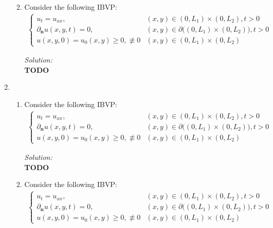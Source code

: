 \documentclass[10pt]{amsart}
\theoremstyle{nonumberplain}
\begin{document}
\begin{enumerate}[label={\bf {\arabic*}:}]
\begin{enumerate}
\newpage


\item Consider the following IBVP:
\begin{align*}
\begin{cases}
u_t = u_{xx}, &(x, y) \in (0, L_1) \times (0, L_2), t > 0 \\
\partial_{\bm n} u(x, y, t) = 0, &(x, y) \in \partial \big( (0, L_1) \times (0, L_2) \big), t > 0 \\
u(x, y, 0) = u_0(x, y) \geq 0, \not \equiv 0 &(x, y) \in (0, L_1) \times (0, L_2)
\end{cases}
\end{align*}

\noindent
\textit{Solution:} \\
\textbf{TODO} \\

\end{enumerate}

\newpage

\item
\begin{enumerate}
\item Consider the following IBVP:
\begin{align*}
\begin{cases}
u_t = u_{xx}, &(x, y) \in (0, L_1) \times (0, L_2), t > 0 \\
\partial_{\bm n} u(x, y, t) = 0, &(x, y) \in \partial \big( (0, L_1) \times (0, L_2) \big), t > 0 \\
u(x, y, 0) = u_0(x, y) \geq 0, \not \equiv 0 &(x, y) \in (0, L_1) \times (0, L_2)
\end{cases}
\end{align*}

\noindent
\textit{Solution:} \\
\textbf{TODO} \\
\newpage


\item Consider the following IBVP:
\begin{align*}
\begin{cases}
u_t = u_{xx}, &(x, y) \in (0, L_1) \times (0, L_2), t > 0 \\
\partial_{\bm n} u(x, y, t) = 0, &(x, y) \in \partial \big( (0, L_1) \times (0, L_2) \big), t > 0 \\
u(x, y, 0) = u_0(x, y) \geq 0, \not \equiv 0 &(x, y) \in (0, L_1) \times (0, L_2)
\end{cases}
\end{align*}


\end{enumerate}
\end{enumerate}
\end{document}
